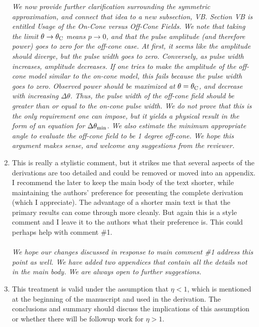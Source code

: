 \documentclass[12pt]{article}
\begin{document}
\begin{enumerate}
\textit{We now provide further clarification surrounding the symmetric approximation, and connect that idea to a new subsection, VB.  Section VB is entitled Usage of the On-Cone versus Off-Cone Fields.  We note that taking the limit $\theta \to \theta_{\rm C}$ means $p \to 0$, and that the pulse amplitude (and therefore power) goes to zero for the off-cone case.  At first, it seems like the amplitude should diverge, but the pulse width goes to zero.  Conversely, as pulse width increases, amplitude decreases.  If one tries to make the amplitude of the off-cone model similar to the on-cone model, this fails because the pulse width goes to zero.  Observed power should be maximized at $\theta = \theta_{\rm C}$, and decrease with increasing $\Delta\theta$.  Thus, the pulse width of the off-cone field should be greater than or equal to the on-cone pulse width.  We do not prove that this is the only requirement one can impose, but it yields a physical result in the form of an equation for $\Delta\theta_{\rm min}$.  We also estimate the minimum appropriate angle to evaluate the off-cone field to be 1 degree off-cone. We hope this argument makes sense, and welcome any suggestions from the reviewer.}
\item This is really a stylistic comment, but it strikes me that several
aspects of the derivations are too detailed and could be removed or
moved into an appendix. I recommend the later to keep the main body of
the text shorter, while maintaining the authors’ preference for
presenting the complete derivation (which I appreciate). The advantage
of a shorter main text is that the primary results can come through
more cleanly. But again this is a style comment and I leave it to the
authors what their preference is. This could perhaps help with comment
\#1. \\ \\
\textit{We hope our changes discussed in response to main comment \#1 address this point as well.  We have added two appendices that contain all the details not in the main body.  We are always open to further suggestions.}
\item This treatment is valid under the assumption that $\eta < 1$, which
is mentioned at the beginning of the manuscript and used in the
derivation. The conclusions and summary should discuss the
implications of this assumption or whether there will be followup work
for $\eta > 1$. \\ \\

\end{enumerate}
\end{document}
